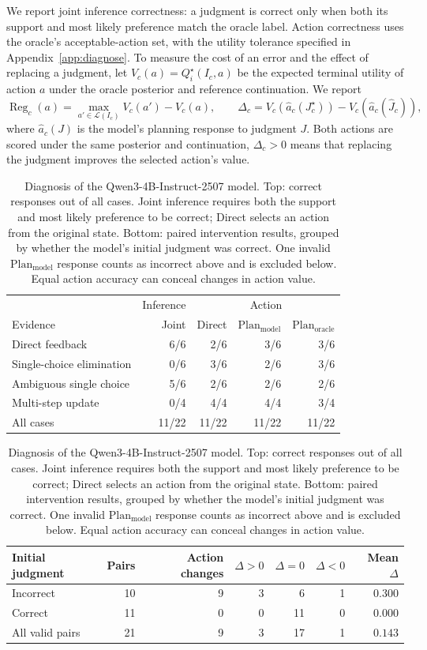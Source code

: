 We report joint inference correctness: a judgment is correct only when both
its support and most likely preference match the oracle label. Action
correctness uses the oracle's acceptable-action set, with the utility
tolerance specified in Appendix~\ref{app:diagnose}. To measure the cost of
an error and the effect of replacing a judgment, let
$V_c(a)=Q_i^\star(I_c,a)$ be the expected terminal utility of action $a$
under the oracle posterior and reference continuation. We report
\begin{equation}
 \operatorname{Reg}_c(a)=\max_{a'\in\mathcal L(I_c)}V_c(a')-V_c(a),\qquad
 \Delta_c=V_c\!\left(\widehat a_c(J_c^\star)\right)
          -V_c\!\left(\widehat a_c(\widehat J_c)\right),
 \label{eq:diagnose-regret}
\end{equation}
where $\widehat a_c(J)$ is the model's planning response to judgment $J$.
Both actions are scored under the same posterior and continuation,
$\Delta_c>0$ means that replacing the judgment improves the selected action's
value.

\begin{table}[t]
\caption{Diagnosis of the Qwen3-4B-Instruct-2507 model.
Top: correct responses out of all cases. Joint inference requires
both the support and most likely preference to be correct; Direct selects an action
from the original state. Bottom: paired intervention results,
grouped by whether the model's initial judgment was correct. One invalid
$\mathrm{Plan}_{\mathrm{model}}$ response counts as incorrect above and is excluded below.
Equal action accuracy can conceal changes in action value.}
\label{tab:diagnose-main}
\centering\small
\begin{tabular}{lrrrr}
\hline
 & Inference & \multicolumn{3}{c}{Action} \\
Evidence & Joint & Direct & $\mathrm{Plan}_{\mathrm{model}}$ & $\mathrm{Plan}_{\mathrm{oracle}}$ \\
\hline
Direct feedback & 6/6 & 2/6 & 3/6 & 3/6 \\
Single-choice elimination & 0/6 & 3/6 & 2/6 & 3/6 \\
Ambiguous single choice & 5/6 & 2/6 & 2/6 & 2/6 \\
Multi-step update & 0/4 & 4/4 & 4/4 & 3/4 \\
\hline
All cases & 11/22 & 11/22 & 11/22 & 11/22 \\
\hline
\end{tabular}
\par\smallskip
\begin{tabular}{lrrrrrr}
\hline
Initial judgment & Pairs & Action changes & $\Delta>0$ & $\Delta=0$ & $\Delta<0$ & Mean $\Delta$ \\
\hline
Incorrect & 10 & 9 & 3 & 6 & 1 & $0.300$ \\
Correct & 11 & 0 & 0 & 11 & 0 & $0.000$ \\
\hline
All valid pairs & 21 & 9 & 3 & 17 & 1 & $0.143$ \\
\hline
\end{tabular}
\end{table}

